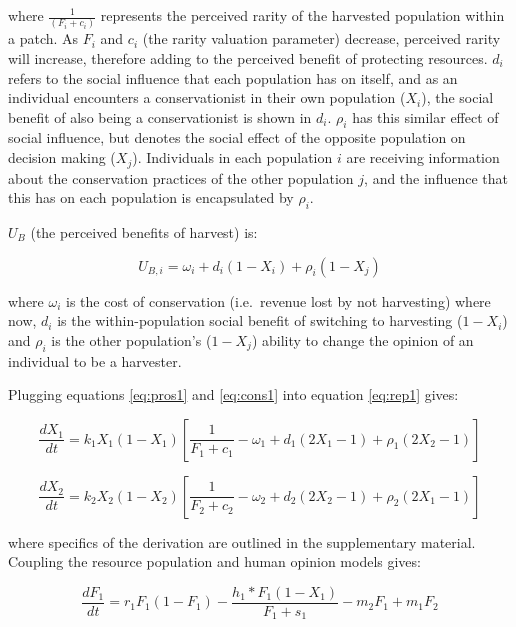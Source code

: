 \documentclass[
  12pt,
]{article}
\begin{document}
where \(\frac{1}{(F_i + c_i)}\) represents the perceived rarity of the harvested population within a patch. As \(F_i\) and \(c_i\) (the rarity valuation parameter) decrease, perceived rarity will increase, therefore adding to the perceived benefit of protecting resources. \(d_i\) refers to the social influence that each population has on itself, and as an individual encounters a conservationist in their own population (\(X_i\)), the social benefit of also being a conservationist is shown in \(d_i\). \(\rho_i\) has this similar effect of social influence, but denotes the social effect of the opposite population on decision making (\(X_j\)). Individuals in each population \(i\) are receiving information about the conservation practices of the other population \(j\), and the influence that this has on each population is encapsulated by \(\rho_i\).

\(U_B\) (the perceived benefits of harvest) is:

\begin{equation} 
U_{B,i} = \omega_i + d_i(1-X_i) + \rho_i(1-X_j)
  \label{eq:cons1}
\end{equation}

where \(\omega_i\) is the cost of conservation (i.e.~revenue lost by not harvesting) where now, \(d_i\) is the within-population social benefit of switching to harvesting (\(1-X_i\)) and \(\rho_i\) is the other population's (\(1-X_j\)) ability to change the opinion of an individual to be a harvester.

Plugging equations \eqref{eq:pros1} and \eqref{eq:cons1} into equation \eqref{eq:rep1} gives:

\begin{equation} 
\frac{dX_1}{dt} =  k_1X_1(1-X_1) [\frac{1}{F_1+c_1} - \omega_1 + d_1(2X_1 - 1) + \rho_1(2X_2 - 1)]
  \label{eq:social1}
\end{equation}

\begin{equation} 
\frac{dX_2}{dt} = k_2X_2(1-X_2)  [\frac{1}{F_2+c_2} - \omega_2 + d_2(2X_2 - 1) +  \rho_2(2X_1 - 1)]
  \label{eq:social2}
\end{equation}

where specifics of the derivation are outlined in the supplementary material. Coupling the resource population and human opinion models gives:

\begin{equation}
\frac{dF_1}{dt} = r_1F_1(1-F_1)-\frac{h_1*F_1(1-X_1)}{F_1 + s_1} -m_2F_1 + m_1F_2
  \label{eq:FishWhole1}
\end{equation}
\end{document}
